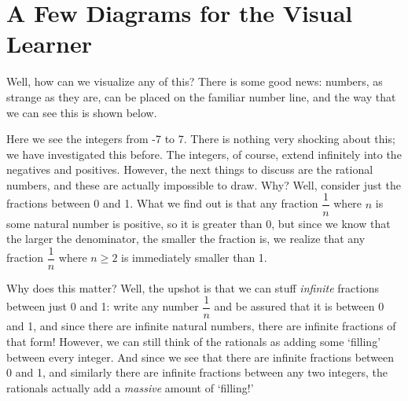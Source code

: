 \documentclass[openany]{book}
\begin{document}
\section{A Few Diagrams for the Visual Learner}
Well, how can we visualize any of this? There is some good news: numbers, as strange as they are, can be placed on the familiar number line, and the way that we can see this is shown below. \vspace{0.4cm}
\begin{center}
\end{center}\par
Here we see the integers from -7 to 7. There is nothing very shocking about this; we have investigated this before. The integers, of course, extend infinitely into the negatives and positives. However, the next things to discuss are the rational numbers, and these are actually impossible to draw. Why? Well, consider just the fractions between 0 and 1. What we find out is that any fraction $\dfrac{1}{n}$ where $n$ is some natural number is positive, so it is greater than 0, but since we know that the larger the denominator, the smaller the fraction is, we realize that any fraction $\dfrac{1}{n}$ where $n \geq 2$ is immediately smaller than 1.\par
Why does this matter? Well, the upshot is that we can stuff \textit{infinite} fractions between just 0 and 1: write any number $\dfrac{1}{n}$ and be assured that it is between 0 and 1, and since there are infinite natural numbers, there are infinite fractions of that form! However, we can still think of the rationals as adding some `filling' between every integer. And since we see that there are infinite fractions between 0 and 1, and similarly there are infinite fractions between any two integers, the rationals actually add a \textit{massive} amount of `filling!'
\begin{center}
\end{center}\par
\end{document}
